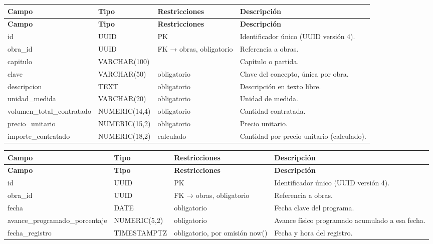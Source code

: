 \begin{xltabular}{\linewidth}{@{}>{\ttfamily\footnotesize}p{4.9cm}>{\ttfamily\footnotesize}p{2.4cm}>{\raggedright\arraybackslash\footnotesize}p{3.3cm}>{\footnotesize}X@{}}
\toprule\normalfont\sffamily\bfseries\footnotesize Campo & \normalfont\sffamily\bfseries\footnotesize Tipo & \sffamily\bfseries Restricciones & \sffamily\bfseries Descripción\\\midrule\endfirsthead
\toprule\normalfont\sffamily\bfseries\footnotesize Campo & \normalfont\sffamily\bfseries\footnotesize Tipo & \sffamily\bfseries Restricciones & \sffamily\bfseries Descripción\\\midrule\endhead
\bottomrule\endfoot
id & UUID & PK & Identificador único (UUID versión 4).\\
obra\_id & UUID & FK → obras, obligatorio & Referencia a obras.\\
capitulo & VARCHAR(100) &  & Capítulo o partida.\\
clave & VARCHAR(50) & obligatorio & Clave del concepto, única por obra.\\
descripcion & TEXT & obligatorio & Descripción en texto libre.\\
unidad\_medida & VARCHAR(20) & obligatorio & Unidad de medida.\\
volumen\_total\_contratado & NUMERIC(14,4) & obligatorio & Cantidad contratada.\\
precio\_unitario & NUMERIC(15,2) & obligatorio & Precio unitario.\\
importe\_contratado & NUMERIC(18,2) & calculado & Cantidad por precio unitario (calculado).\\
\end{xltabular}

\begin{xltabular}{\linewidth}{@{}>{\ttfamily\footnotesize}p{4.9cm}>{\ttfamily\footnotesize}p{2.4cm}>{\raggedright\arraybackslash\footnotesize}p{3.3cm}>{\footnotesize}X@{}}
\toprule\normalfont\sffamily\bfseries\footnotesize Campo & \normalfont\sffamily\bfseries\footnotesize Tipo & \sffamily\bfseries Restricciones & \sffamily\bfseries Descripción\\\midrule\endfirsthead
\toprule\normalfont\sffamily\bfseries\footnotesize Campo & \normalfont\sffamily\bfseries\footnotesize Tipo & \sffamily\bfseries Restricciones & \sffamily\bfseries Descripción\\\midrule\endhead
\bottomrule\endfoot
id & UUID & PK & Identificador único (UUID versión 4).\\
obra\_id & UUID & FK → obras, obligatorio & Referencia a obras.\\
fecha & DATE & obligatorio & Fecha clave del programa.\\
avance\_programado\_porcentaje & NUMERIC(5,2) & obligatorio & Avance físico programado acumulado a esa fecha.\\
fecha\_registro & TIMESTAMPTZ & obligatorio, por omisión now() & Fecha y hora del registro.\\
\end{xltabular}

